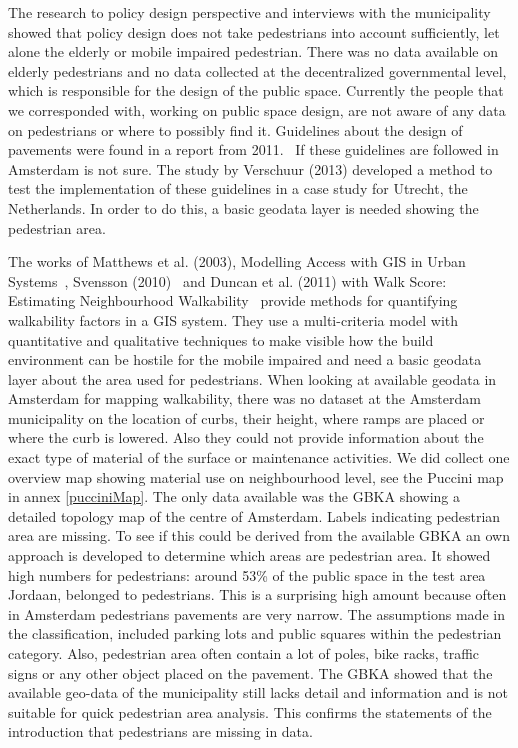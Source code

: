 The research to policy design perspective and interviews with the municipality showed that policy design does not take pedestrians into account sufficiently, let alone the elderly or mobile impaired pedestrian. There was no data available on elderly pedestrians and no data collected at the decentralized governmental level, which is responsible for the design of the public space. Currently the people that we corresponded with, working on public space design, are not aware of any data on pedestrians or where to possibly find it. Guidelines about the design of pavements were found in a report from 2011.~\cite{leidraad2011} If these guidelines are followed in Amsterdam is not sure. The study by Verschuur (2013) developed a method to test the implementation of these guidelines in a case study for Utrecht, the Netherlands. In order to do this, a basic geodata layer is needed showing the pedestrian area. 

The works of Matthews et al. (2003), Modelling Access with GIS in Urban Systems~\cite{Matthews2003}, Svensson (2010)~\cite{Svensson2010} and Duncan et al. (2011) with Walk Score: Estimating Neighbourhood Walkability~\cite{Duncan2011} provide methods for quantifying walkability factors in a GIS system. They use a multi-criteria model with quantitative and qualitative techniques to make visible how the build environment can be hostile for the mobile impaired and need a basic geodata layer about the area used for pedestrians. When looking at available geodata in Amsterdam for mapping walkability, there was no dataset at the Amsterdam municipality on the location of curbs, their height, where ramps are placed or where the curb is lowered. Also they could not provide information about the exact type of material of the surface or maintenance activities. We did collect one overview map showing material use on neighbourhood level, see the Puccini map in annex \ref{pucciniMap}. The only data available was the GBKA showing a detailed topology map of the centre of Amsterdam. Labels indicating pedestrian area are missing. To see if this could be derived from the available GBKA an own approach is developed to determine which areas are pedestrian area. It showed high numbers for pedestrians: around 53\% of the public space in the test area Jordaan, belonged to pedestrians. This is a surprising high amount because often in Amsterdam pedestrians pavements are very narrow. The assumptions made in the classification, included parking lots and public squares within the pedestrian category. Also, pedestrian area often contain a lot of poles, bike racks, traffic signs or any other object placed on the pavement. The GBKA showed that the available geo-data of the municipality still lacks detail and information and is not suitable for quick pedestrian area analysis. This confirms the statements of the introduction that pedestrians are missing in data.

